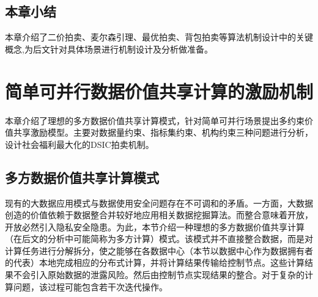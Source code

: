 \documentclass[promaster]{thesis-uestc}
\begin{document}
%
%
%
%

\section{本章小结}
本章介绍了二价拍卖、麦尔森引理、最优拍卖、背包拍卖等算法机制设计中的关键概念,为后文针对具体场景进行机制设计及分析做准备。

\chapter{简单可并行数据价值共享计算的激励机制}
本章介绍了理想的多方数据价值共享计算模式，针对简单可并行场景提出多约束价值共享激励模型。主要对数据量约束、指标集约束、机构约束三种问题进行分析，设计社会福利最大化的DSIC拍卖机制。

\section{多方数据价值共享计算模式}
现有的大数据应用模式与数据使用安全问题存在不可调和的矛盾。一方面，大数据创造的价值依赖于数据整合并较好地应用相关数据挖掘算法。而整合意味着开放，开放必然引入隐私安全隐患。为此，本节介绍一种理想的多方数据价值共享计算（在后文的分析中可能简称为多方计算）模式。该模式并不直接整合数据，而是对计算任务进行分解拆分，使之能够在各数据中心（本节以数据中心作为数据拥有者的代表）本地完成相应的分布式计算，并将计算结果传输给控制节点。这些计算结果不会引入原始数据的泄露风险。然后由控制节点实现结果的整合。对于复杂的计算问题，该过程可能包含若干次迭代操作。
\end{document}
